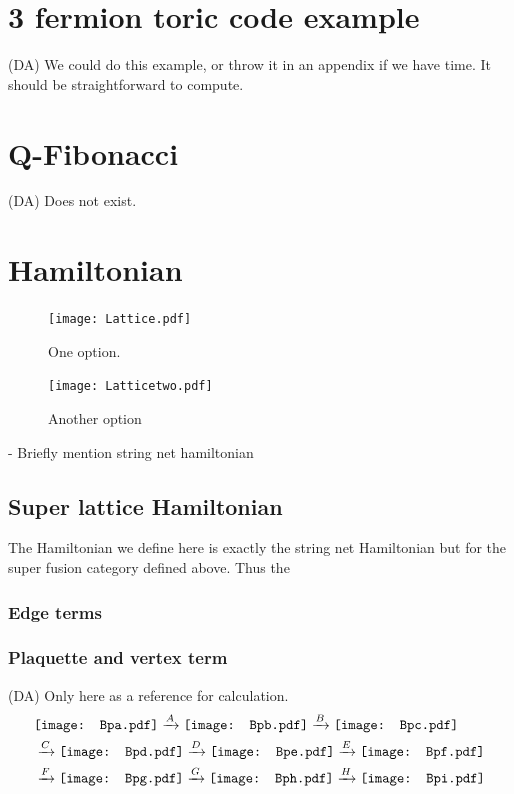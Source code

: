 \documentclass[12pt,a4paper]{article}
\newcounter{arrow}
\newcommand{\tp}{\otimes}
\newcommand{\dave}[1]{{\color{ao(english)}\footnotesize{(DA) #1}}}
\newcommand{\Bpa}{\mathord{\vcenter{\hbox{\texttt{[image: Bpa.pdf]}}}}}
\newcommand{\Bpb}{\mathord{\vcenter{\hbox{\texttt{[image: Bpb.pdf]}}}}}
\newcommand{\Bpc}{\mathord{\vcenter{\hbox{\texttt{[image: Bpc.pdf]}}}}}
\newcommand{\Bpd}{\mathord{\vcenter{\hbox{\texttt{[image: Bpd.pdf]}}}}}
\newcommand{\Bpe}{\mathord{\vcenter{\hbox{\texttt{[image: Bpe.pdf]}}}}}
\newcommand{\Bpf}{\mathord{\vcenter{\hbox{\texttt{[image: Bpf.pdf]}}}}}
\newcommand{\Bpg}{\mathord{\vcenter{\hbox{\texttt{[image: Bpg.pdf]}}}}}
\newcommand{\Bph}{\mathord{\vcenter{\hbox{\texttt{[image: Bph.pdf]}}}}}
\newcommand{\Bpi}{\mathord{\vcenter{\hbox{\texttt{[image: Bpi.pdf]}}}}}
\begin{document}
\section{3 fermion toric code example}
\dave{We could do this example, or throw it in an appendix if we have time. It should be straightforward to compute. }


\section{Q-Fibonacci}
\dave{Does not exist.}
 \section{Hamiltonian} 
 \begin{figure}
 \texttt{[image: Lattice.pdf]}
 \caption{One option.}
 \end{figure}
 
  \begin{figure}
 \texttt{[image: Latticetwo.pdf]}
 \caption{Another option}
 \end{figure}
  
 - Briefly mention string net hamiltonian

 \subsection{Super lattice Hamiltonian}
The Hamiltonian we define here is exactly the string net Hamiltonian but for the super fusion category defined above. 
Thus the 
\subsubsection{Edge terms}
\subsubsection{Plaquette and vertex term}
\dave{Only here as a reference for calculation.}
\begin{align}
&\Bpa \xrightarrow{A} \Bpb \xrightarrow{B} \Bpc \\
&\xrightarrow{C}\Bpd  \xrightarrow{D} \Bpe \xrightarrow{E}\Bpf \\
&\xrightarrow{F} \Bpg \xrightarrow{G} \Bph \xrightarrow{H}   \Bpi
\end{align}
 
\end{document}
